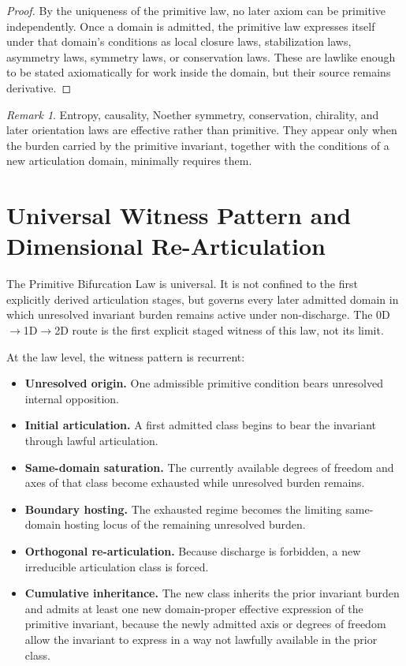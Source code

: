 \documentclass[11pt]{article}
\theoremstyle{definition}
\theoremstyle{plain}
\theoremstyle{remark}
\newtheorem{remark}{Remark}
\begin{document}
\begin{proof}
By the uniqueness of the primitive law, no later axiom can be primitive independently. Once a domain is admitted, the primitive law expresses itself under that domain's conditions as local closure laws, stabilization laws, asymmetry laws, symmetry laws, or conservation laws. These are lawlike enough to be stated axiomatically for work inside the domain, but their source remains derivative. 
\end{proof}

\begin{remark}
Entropy, causality, Noether symmetry, conservation, chirality, and later orientation laws are effective rather than primitive. They appear only when the burden carried by the primitive invariant, together with the conditions of a new articulation domain, minimally requires them.
\end{remark}

\section{Universal Witness Pattern and Dimensional Re-Articulation}

The Primitive Bifurcation Law is universal. It is not confined to the first
explicitly derived articulation stages, but governs every later admitted
domain in which unresolved invariant burden remains active under
non-discharge. The 0D$\to$1D$\to$2D route is the first explicit staged
witness of this law, not its limit.

At the law level, the witness pattern is recurrent:

\begin{itemize}[leftmargin=2.2em]
    \item \textbf{Unresolved origin.} One admissible primitive condition bears unresolved internal opposition.
    \item \textbf{Initial articulation.} A first admitted class begins to bear the invariant through lawful articulation.
    \item \textbf{Same-domain saturation.} The currently available degrees of freedom and axes of that class become exhausted while unresolved burden remains.
    \item \textbf{Boundary hosting.} The exhausted regime becomes the limiting same-domain hosting locus of the remaining unresolved burden.
    \item \textbf{Orthogonal re-articulation.} Because discharge is forbidden, a new irreducible articulation class is forced.
    \item \textbf{Cumulative inheritance.} The new class inherits the prior invariant burden and admits at least one new domain-proper effective expression of the primitive invariant, because the newly admitted axis or degrees of freedom allow the invariant to express in a way not lawfully available in the prior class.
\end{itemize}
\end{document}
